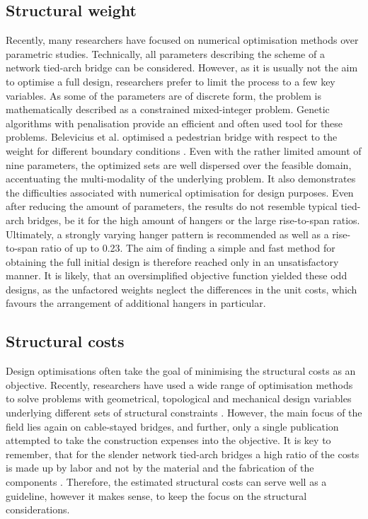 \subsection{Structural weight} \label{sec:rev_weight}
Recently, many researchers have focused on numerical optimisation methods over parametric studies. Technically, all parameters describing the scheme of a network tied-arch bridge can be considered. However, as it is usually not the aim to optimise a full design, researchers prefer to limit the process to a few key variables. As some of the parameters are of discrete form, the problem is mathematically described as a constrained mixed-integer problem. Genetic algorithms with penalisation provide an efficient and often used tool for these problems. Belevicius et al. optimised a pedestrian bridge with respect to the weight for different boundary conditions \cite{Belevicius}. Even with the rather limited amount of nine parameters, the optimized sets are well dispersed over the feasible domain, accentuating the multi-modality of the underlying problem.
It also demonstrates the difficulties associated with numerical optimisation for design purposes. Even after reducing the amount of parameters, the results do not resemble typical tied-arch bridges, be it for the high amount of hangers or the large rise-to-span ratios. Ultimately, a strongly varying hanger pattern is recommended as well as a rise-to-span ratio of up to 0.23. The aim of finding a simple and fast method for obtaining the full initial design is therefore reached only in an unsatisfactory manner.
It is likely, that an oversimplified objective function yielded these odd designs, as the unfactored weights neglect the differences in the unit costs, which favours the arrangement of additional hangers in particular.

\subsection{Structural costs}
Design optimisations often take the goal of minimising the structural costs as an objective. Recently, researchers have used a wide range of optimisation methods to solve problems with geometrical, topological and mechanical design variables underlying different sets of structural constraints \cite{MARTINS}. However, the main focus of the field lies again on cable-stayed bridges, and further, only a single publication attempted to take the construction expenses into the objective. It is key to remember, that for the slender network tied-arch bridges a high ratio of the costs is made up by labor and not by the material and the fabrication of the components \cite{Tveit2}. Therefore, the estimated structural costs can serve well as a guideline, however it makes sense, to keep the focus on the structural considerations.

